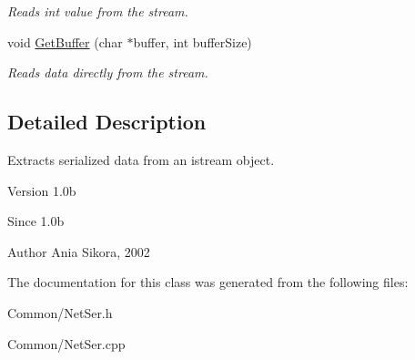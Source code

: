 \begin{DoxyCompactItemize}
\begin{DoxyCompactList}\small\item\em Reads int value from the stream. \end{DoxyCompactList}\item 
\hypertarget{class_common_1_1_network_de_serializer_a4c5d801b6d105f91e475f6e6387f702b}{void \hyperlink{class_common_1_1_network_de_serializer_a4c5d801b6d105f91e475f6e6387f702b}{Get\-Buffer} (char $\ast$buffer, int buffer\-Size)}\label{class_common_1_1_network_de_serializer_a4c5d801b6d105f91e475f6e6387f702b}

\begin{DoxyCompactList}\small\item\em Reads data directly from the stream. \end{DoxyCompactList}\end{DoxyCompactItemize}


\subsection{Detailed Description}
Extracts serialized data from an istream object. 

\begin{DoxyVersion}{Version}
1.\-0b 
\end{DoxyVersion}
\begin{DoxySince}{Since}
1.\-0b 
\end{DoxySince}
\begin{DoxyAuthor}{Author}
Ania Sikora, 2002 
\end{DoxyAuthor}


The documentation for this class was generated from the following files\-:\begin{DoxyCompactItemize}
\item 
Common/Net\-Ser.\-h\item 
Common/Net\-Ser.\-cpp\end{DoxyCompactItemize}
